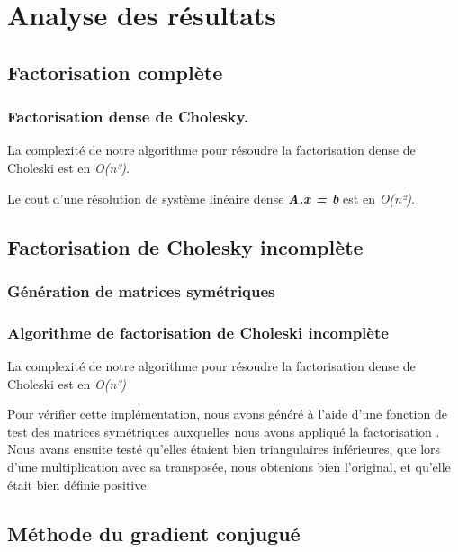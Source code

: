 \section{Analyse des résultats}

\subsection{Factorisation complète}

\subsubsection{Factorisation dense de Cholesky.}

La complexité de notre algorithme pour résoudre la factorisation dense de Choleski est en \textit{O(n³)}.

\vspace{0.25cm}

Le cout d'une résolution de système linéaire dense \textit{\textbf{A.x = b}} est en \textit{O(n²)}.

\subsection{Factorisation de Cholesky incomplète}

\subsubsection{Génération de matrices symétriques}

\subsubsection{Algorithme de factorisation de Choleski incomplète}

La complexité de notre algorithme pour résoudre la factorisation dense de Choleski est en \textit{O(n³)}

Pour vérifier cette implémentation, nous avons généré à l'aide d'une fonction de test des matrices symétriques auxquelles nous avons appliqué la factorisation . Nous avans ensuite testé qu'elles étaient bien triangulaires inférieures, que lors d'une multiplication avec sa transposée, nous obtenions bien l'original, et qu'elle était bien définie positive.

\subsection{Méthode du gradient conjugué}

